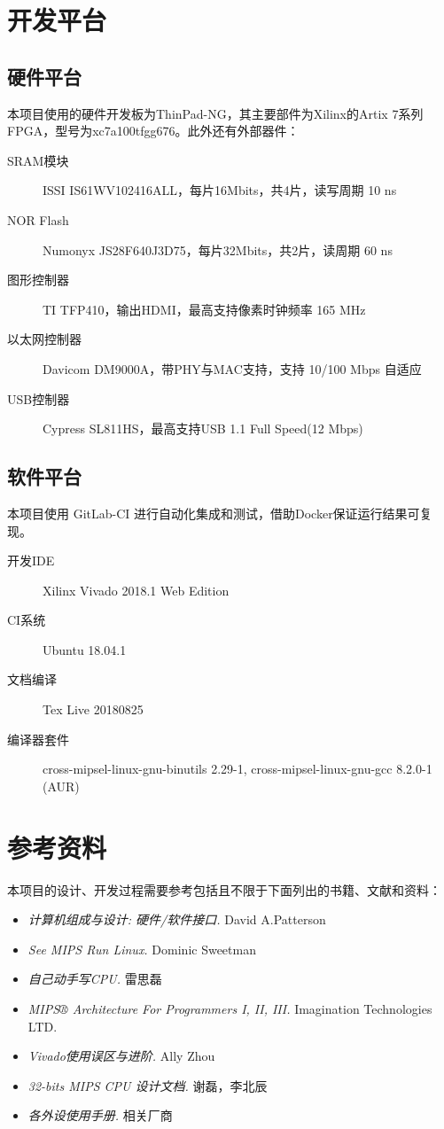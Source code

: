 \section{开发平台}

\subsection{硬件平台}

本项目使用的硬件开发板为ThinPad-NG，其主要部件为Xilinx的Artix 7系列FPGA，型号为xc7a100tfgg676。此外还有外部器件：

\begin{description}
    \item[SRAM模块] ISSI IS61WV102416ALL，每片16Mbits，共4片，读写周期 10 ns
    \item[NOR Flash] Numonyx JS28F640J3D75，每片32Mbits，共2片，读周期 60 ns
    \item[图形控制器] TI TFP410，输出HDMI，最高支持像素时钟频率 165 MHz
    \item[以太网控制器] Davicom DM9000A，带PHY与MAC支持，支持 10/100 Mbps 自适应
    \item[USB控制器] Cypress SL811HS，最高支持USB 1.1 Full Speed(12 Mbps)
\end{description}

\subsection{软件平台}
\label{section:software_platform}

本项目使用 GitLab-CI 进行自动化集成和测试，借助Docker保证运行结果可复现。

\begin{description}
    \item[开发IDE] Xilinx Vivado 2018.1 Web Edition
    \item[CI系统] Ubuntu 18.04.1
    \item[文档编译] Tex Live 20180825
    \item[编译器套件] cross-mipsel-linux-gnu-binutils 2.29-1, cross-mipsel-linux-gnu-gcc 8.2.0-1 (AUR)
\end{description}

\section{参考资料}

本项目的设计、开发过程需要参考包括且不限于下面列出的书籍、文献和资料：
\begin{itemize}
    \item \textit{计算机组成与设计: 硬件/软件接口.} David A.Patterson
    \item \textit{See MIPS Run Linux.} Dominic Sweetman
    \item \textit{自己动手写CPU.} 雷思磊
    \item \textit{MIPS® Architecture For Programmers I, II, III.} Imagination Technologies LTD.
    \item \textit{Vivado使用误区与进阶.} Ally Zhou
    \item \textit{32-bits MIPS CPU 设计文档.} 谢磊，李北辰
    \item \textit{各外设使用手册.} 相关厂商
\end{itemize}